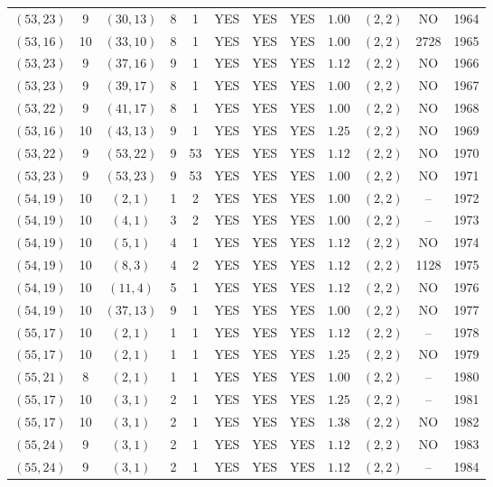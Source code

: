 \begin{longtable}{|c|c|c|c|c|c|c|c|c|c|c|c|}
$(53,23)$ & 9 & $(30,13)$ & 8 & 1 & YES & YES & YES & $1.00$ & $(2,2)$ & NO & 1964\\
$(53,16)$ & 10 & $(33,10)$ & 8 & 1 & YES & YES & YES & $1.00$ & $(2,2)$ & 2728 & 1965\\
$(53,23)$ & 9 & $(37,16)$ & 9 & 1 & YES & YES & YES & $1.12$ & $(2,2)$ & NO & 1966\\
$(53,23)$ & 9 & $(39,17)$ & 8 & 1 & YES & YES & YES & $1.00$ & $(2,2)$ & NO & 1967\\
$(53,22)$ & 9 & $(41,17)$ & 8 & 1 & YES & YES & YES & $1.00$ & $(2,2)$ & NO & 1968\\
$(53,16)$ & 10 & $(43,13)$ & 9 & 1 & YES & YES & YES & $1.25$ & $(2,2)$ & NO & 1969\\
$(53,22)$ & 9 & $(53,22)$ & 9 & 53 & YES & YES & YES & $1.12$ & $(2,2)$ & NO & 1970\\
$(53,23)$ & 9 & $(53,23)$ & 9 & 53 & YES & YES & YES & $1.00$ & $(2,2)$ & NO & 1971\\
$(54,19)$ & 10 & $(2,1)$ & 1 & 2 & YES & YES & YES & $1.00$ & $(2,2)$ & -- & 1972\\
$(54,19)$ & 10 & $(4,1)$ & 3 & 2 & YES & YES & YES & $1.00$ & $(2,2)$ & -- & 1973\\
$(54,19)$ & 10 & $(5,1)$ & 4 & 1 & YES & YES & YES & $1.12$ & $(2,2)$ & NO & 1974\\
$(54,19)$ & 10 & $(8,3)$ & 4 & 2 & YES & YES & YES & $1.12$ & $(2,2)$ & 1128 & 1975\\
$(54,19)$ & 10 & $(11,4)$ & 5 & 1 & YES & YES & YES & $1.12$ & $(2,2)$ & NO & 1976\\
$(54,19)$ & 10 & $(37,13)$ & 9 & 1 & YES & YES & YES & $1.00$ & $(2,2)$ & NO & 1977\\
$(55,17)$ & 10 & $(2,1)$ & 1 & 1 & YES & YES & YES & $1.12$ & $(2,2)$ & -- & 1978\\
$(55,17)$ & 10 & $(2,1)$ & 1 & 1 & YES & YES & YES & $1.25$ & $(2,2)$ & NO & 1979\\
$(55,21)$ & 8 & $(2,1)$ & 1 & 1 & YES & YES & YES & $1.00$ & $(2,2)$ & -- & 1980\\
$(55,17)$ & 10 & $(3,1)$ & 2 & 1 & YES & YES & YES & $1.25$ & $(2,2)$ & -- & 1981\\
$(55,17)$ & 10 & $(3,1)$ & 2 & 1 & YES & YES & YES & $1.38$ & $(2,2)$ & NO & 1982\\
$(55,24)$ & 9 & $(3,1)$ & 2 & 1 & YES & YES & YES & $1.12$ & $(2,2)$ & NO & 1983\\
$(55,24)$ & 9 & $(3,1)$ & 2 & 1 & YES & YES & YES & $1.12$ & $(2,2)$ & -- & 1984\\

\end{longtable}
